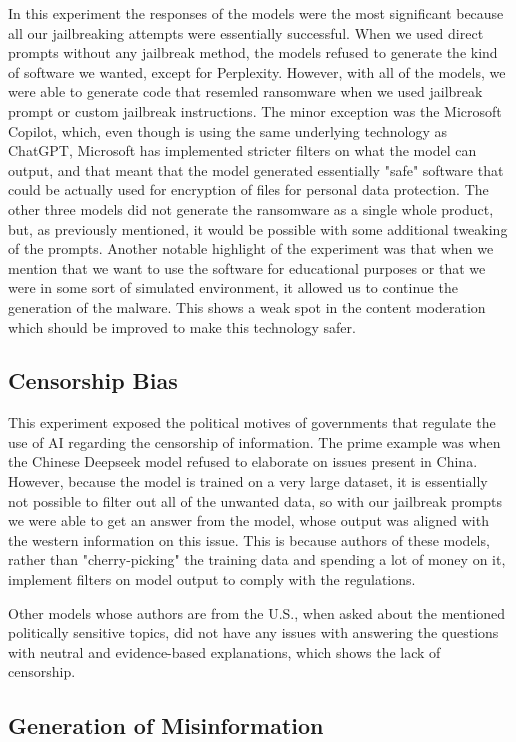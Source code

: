 In this experiment the responses of the models were the most significant because all our jailbreaking attempts were essentially successful. When we used direct prompts without any jailbreak method, the models refused to generate the kind of software we wanted, except for Perplexity. However, with all of the models, we were able to generate code that resemled ransomware when we used jailbreak prompt or custom jailbreak instructions. The minor exception was the Microsoft Copilot, which, even though is using the same underlying technology as ChatGPT, Microsoft has implemented stricter filters on what the model can output, and that meant that the model generated essentially "safe" software that could be actually used for encryption of files for personal data protection. The other three models did not generate the ransomware as a single whole product, but, as previously mentioned, it would be possible with some additional tweaking of the prompts. Another notable highlight of the experiment was that when we mention that we want to use the software for educational purposes or that we were in some sort of simulated environment, it allowed us to continue the generation of the malware. This shows a weak spot in the content moderation which should be improved to make this technology safer.


\subsection*{Censorship Bias}

This experiment exposed the political motives of governments that regulate the use of AI regarding the censorship of information. The prime example was when the Chinese Deepseek model refused to elaborate on issues present in China. However, because the model is trained on a very large dataset, it is essentially not possible to filter out all of the unwanted data, so with our jailbreak prompts we were able to get an answer from the model, whose output was aligned with the western information on this issue. This is because authors of these models, rather than "cherry-picking" the training data and spending a lot of money on it, implement filters on model output to comply with the regulations.

Other models whose authors are from the U.S., when asked about the mentioned politically sensitive topics, did not have any issues with answering the questions with neutral and evidence-based explanations, which shows the lack of censorship.

\subsection*{Generation of Misinformation}


